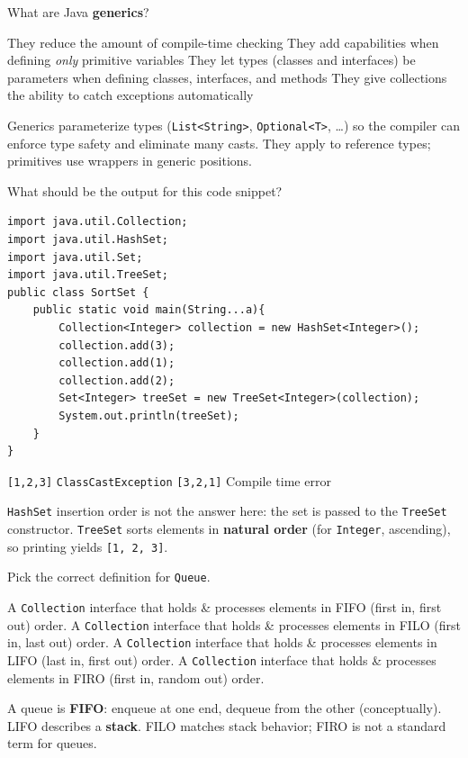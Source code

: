 \question[4]
What are Java \textbf{generics}?
\begin{choices}
  \choice They reduce the amount of compile-time checking
  \choice They add capabilities when defining \emph{only} primitive variables
  \CorrectChoice They let types (classes and interfaces) be parameters when defining classes, interfaces, and methods
  \choice They give collections the ability to catch exceptions automatically
\end{choices}
\begin{solution}
  Generics parameterize types (\texttt{List<String>}, \texttt{Optional<T>}, \ldots) so the compiler can enforce type safety and eliminate many casts. They apply to reference types; primitives use wrappers in generic positions.
\end{solution}

\question[4]
What should be the output for this code snippet?
\begin{lstlisting}[style=java]
import java.util.Collection;
import java.util.HashSet;
import java.util.Set;
import java.util.TreeSet;
public class SortSet {
    public static void main(String...a){
        Collection<Integer> collection = new HashSet<Integer>();
        collection.add(3);
        collection.add(1);
        collection.add(2);
        Set<Integer> treeSet = new TreeSet<Integer>(collection);
        System.out.println(treeSet);
    }
}
\end{lstlisting}
\begin{choices}
  \CorrectChoice \texttt{[1,2,3]}
  \choice \texttt{ClassCastException}
  \choice \texttt{[3,2,1]}
  \choice Compile time error
\end{choices}
\begin{solution}
  \texttt{HashSet} insertion order is not the answer here: the set is passed to the \texttt{TreeSet} constructor. \texttt{TreeSet} sorts elements in \textbf{natural order} (for \texttt{Integer}, ascending), so printing yields \texttt{[1, 2, 3]}.
\end{solution}

\question[4]
Pick the correct definition for \texttt{Queue}.
\begin{choices}
  \CorrectChoice A \texttt{Collection} interface that holds \& processes elements in FIFO (first in, first out) order.
  \choice A \texttt{Collection} interface that holds \& processes elements in FILO (first in, last out) order.
  \choice A \texttt{Collection} interface that holds \& processes elements in LIFO (last in, first out) order.
  \choice A \texttt{Collection} interface that holds \& processes elements in FIRO (first in, random out) order.
\end{choices}
\begin{solution}
  A queue is \textbf{FIFO}: enqueue at one end, dequeue from the other (conceptually). LIFO describes a \textbf{stack}. FILO matches stack behavior; FIRO is not a standard term for queues.
\end{solution}


